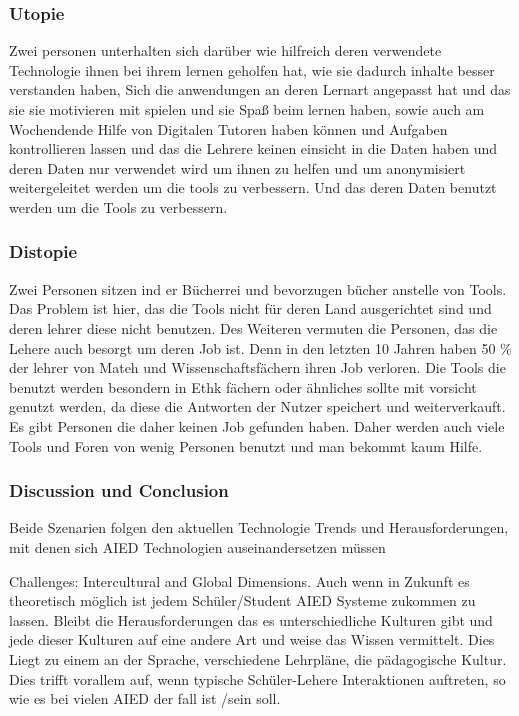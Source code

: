 \subsubsection{Utopie}
Zwei personen unterhalten sich darüber wie hilfreich deren verwendete Technologie ihnen bei ihrem
lernen geholfen hat, wie sie dadurch inhalte besser verstanden haben, Sich die anwendungen an deren Lernart angepasst hat und das sie sie motivieren mit spielen und sie Spaß beim lernen haben, sowie auch am Wochendende Hilfe von Digitalen Tutoren haben können und Aufgaben kontrollieren lassen
und das die Lehrere keinen einsicht in die Daten haben und deren Daten nur verwendet wird um ihnen zu helfen und um anonymisiert weitergeleitet werden um die tools zu verbessern. Und das deren Daten benutzt werden um die Tools zu verbessern.


\subsubsection{Distopie}
Zwei Personen sitzen ind er Bücherrei und bevorzugen bücher anstelle von Tools. Das Problem ist hier, das die Tools nicht für deren Land ausgerichtet sind und deren lehrer diese nicht benutzen. 
Des Weiteren vermuten die Personen, das die Lehere auch besorgt um deren Job ist. Denn in den letzten 10 Jahren haben 50 \% der lehrer von Mateh und Wissenschaftsfächern ihren Job verloren.
Die Tools die benutzt werden besondern in Ethk fächern oder ähnliches sollte mit vorsicht genutzt werden, da diese die Antworten der Nutzer speichert und weiterverkauft. Es gibt Personen die daher keinen Job gefunden haben.
Daher werden auch viele Tools und Foren von wenig Personen benutzt und man bekommt kaum Hilfe.

\subsubsection{Discussion und Conclusion}
Beide Szenarien folgen den aktuellen Technologie Trends und Herausforderungen, mit denen sich AIED Technologien auseinandersetzen müssen

Challenges: Intercultural and Global Dimensions. Auch wenn in Zukunft es theoretisch möglich ist jedem Schüler/Student AIED Systeme zukommen zu lassen.
 Bleibt die Herausforderungen das es unterschiedliche Kulturen gibt und jede dieser Kulturen auf eine andere Art und weise das Wissen vermittelt. Dies Liegt zu einem an der Sprache, 
 verschiedene Lehrpläne, die pädagogische Kultur. Dies trifft vorallem auf, wenn typische Schüler-Lehere Interaktionen auftreten, so wie es bei vielen AIED der fall ist /sein soll.

